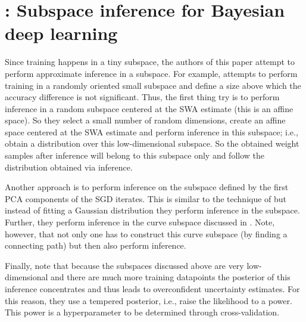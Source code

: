 \section{\textcite{izmailov2019subspace}: Subspace inference for Bayesian deep learning}
Since training happens in a tiny subspace, the authors of this paper attempt to perform approximate inference in a subspace. 
For example, \textcite{li2018measuring} attempts to perform training in a randomly oriented small subspace and define a size above which the accuracy difference is not significant.
Thus, the first thing \textcite{izmailov2019subspace} try is to perform inference in a random subspace centered at the SWA estimate (this is an affine space).
So they select a small number of random dimensions, create an affine space centered at the SWA estimate and perform inference in this subspace; i.e., obtain a distribution over this low-dimensional subspace. 
So the obtained weight samples after inference will belong to this subspace only and follow the distribution obtained via inference.

Another approach is to perform inference on the subspace defined by the first PCA components of the SGD iterates. 
This is similar to the technique of \textcite{maddox2019simple} but instead of fitting a Gaussian distribution they perform inference in the subspace. 
Further, they perform inference in the curve subspace discussed in \textcite{garipov2018loss}.
Note, however, that not only one has to construct this curve subspace (by finding a connecting path) but then also perform inference. 

Finally, note that because the subspaces discussed above are very low-dimensional and there are much more training datapoints the posterior of this inference concentrates and thus leads to overconfident uncertainty estimates. 
For this reason, they use a tempered posterior, i.e., raise the likelihood to a power.
This power is a hyperparameter to be determined through cross-validation.







 


\newpage	
\printbibliography[heading=bibintoc,title={References}]
	
